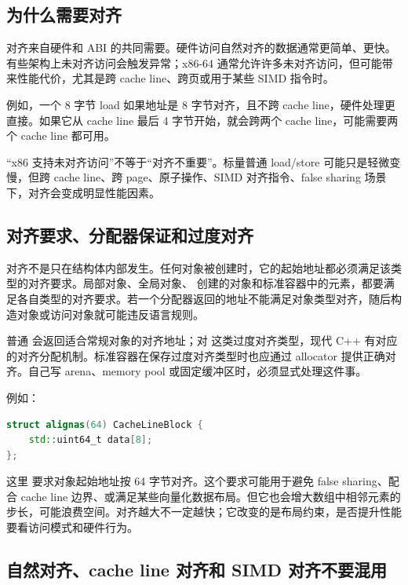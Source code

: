 \subsection{为什么需要对齐}

对齐来自硬件和 ABI 的共同需要。硬件访问自然对齐的数据通常更简单、更快。有些架构上未对齐访问会触发异常；x86-64 通常允许许多未对齐访问，但可能带来性能代价，尤其是跨 cache line、跨页或用于某些 SIMD 指令时。

例如，一个 8 字节 load 如果地址是 8 字节对齐，且不跨 cache line，硬件处理更直接。如果它从 cache line 最后 4 字节开始，就会跨两个 cache line，可能需要两个 cache line 都可用。

\begin{deepdive}
“x86 支持未对齐访问”不等于“对齐不重要”。标量普通 load/store 可能只是轻微变慢，但跨 cache line、跨 page、原子操作、SIMD 对齐指令、false sharing 场景下，对齐会变成明显性能因素。
\end{deepdive}

\subsection{对齐要求、分配器保证和过度对齐}

对齐不是只在结构体内部发生。任何对象被创建时，它的起始地址都必须满足该类型的对齐要求。局部对象、全局对象、 创建的对象和标准容器中的元素，都要满足各自类型的对齐要求。若一个分配器返回的地址不能满足对象类型对齐，随后构造对象或访问对象就可能违反语言规则。

普通  会返回适合常规对象的对齐地址；对  这类过度对齐类型，现代 C++ 有对应的对齐分配机制。标准容器在保存过度对齐类型时也应通过 allocator 提供正确对齐。自己写 arena、memory pool 或固定缓冲区时，必须显式处理这件事。

例如：

\begin{lstlisting}[language=C++]
struct alignas(64) CacheLineBlock {
    std::uint64_t data[8];
};
\end{lstlisting}

这里  要求对象起始地址按 64 字节对齐。这个要求可能用于避免 false sharing、配合 cache line 边界、或满足某些向量化数据布局。但它也会增大数组中相邻元素的步长，可能浪费空间。对齐越大不一定越快；它改变的是布局约束，是否提升性能要看访问模式和硬件行为。

\subsection{自然对齐、cache line 对齐和 SIMD 对齐不要混用}

